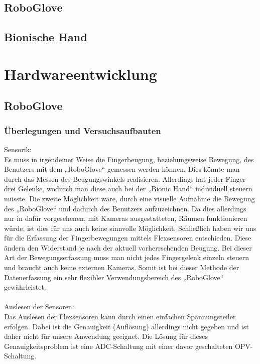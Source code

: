 \documentclass[11pt]{article}
\begin{document}
\subsection{RoboGlove}

\subsection{Bionische Hand}


\section{Hardwareentwicklung}

\subsection{RoboGlove}
\subsubsection{Überlegungen und Versuchsaufbauten}
Sensorik:
\\
Es muss in irgendeiner Weise die Fingerbeugung, beziehungsweise Bewegung, des Benutzers mit dem „RoboGlove“ gemessen 
werden können. Dies könnte man durch das Messen des Beugungswinkels realisieren. Allerdings hat jeder Finger drei Gelenke, 
wodurch man diese auch bei der „Bionic Hand“ individuell steuern müsste. Die zweite Möglichkeit wäre, durch eine visuelle 
Aufnahme die Bewegung des „RoboGlove“ und dadurch des Benutzers aufzuzeichnen. Da dies allerdings nur in dafür vorgesehenen, 
mit Kameras ausgestatteten, Räumen funktionieren würde, ist dies für uns auch keine sinnvolle Möglichkeit. Schließlich haben 
wir uns für die Erfassung der Fingerbewegungen mittels Flexsensoren entschieden. Diese ändern den Widerstand je nach der 
aktuell vorherrschenden Beugung. Bei dieser Art der Bewegungserfassung muss man nicht jedes Fingergelenk einzeln steuern und 
braucht auch keine externen Kameras. Somit ist bei dieser Methode der Datenerfassung ein sehr flexibler Verwendungsbereich 
des „RoboGlove“ gewährleistet.\\
\\
Auslesen der Sensoren:
\\
Das Auslesen der Flexsensoren kann durch einen einfachen Spannungsteiler erfolgen. Dabei ist die Genauigkeit (Auflösung) 
allerdings nicht gegeben und ist daher nicht für unsere Anwendung geeignet. Die Lösung für dieses Genauigkeitsproblem ist 
eine ADC-Schaltung mit einer davor geschalteten OPV-Schaltung.
\end{document}
